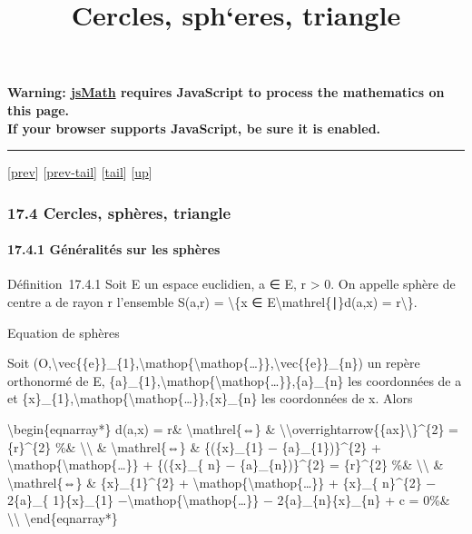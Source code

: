 \documentclass[]{article}
\title{Cercles, sph`eres, triangle}
\author{}
\date{}
\begin{document}
\maketitle

\textbf{Warning: \href{http://www.math.union.edu/locate/jsMath}{jsMath}
requires JavaScript to process the mathematics on this page.\\ If your
browser supports JavaScript, be sure it is enabled.}

\begin{center}\rule{3in}{0.4pt}\end{center}

{[}\href{coursse94.html}{prev}{]}
{[}\href{coursse94.html\#tailcoursse94.html}{prev-tail}{]}
{[}\hyperref[tailcoursse95.html]{tail}{]}
{[}\href{coursch18.html\#coursse95.html}{up}{]}

\subsubsection{17.4 Cercles, sphères, triangle}

\paragraph{17.4.1 Généralités sur les sphères}

Définition~17.4.1 Soit E un espace euclidien, a ∈ E, r \textgreater{} 0.
On appelle sphère de centre a de rayon r l'ensemble S(a,r) =
\textbackslash{}\{x ∈ E\textbackslash{}mathrel\{∣\}d(a,x) =
r\textbackslash{}\}.

Equation de sphères

Soit
(O,\textbackslash{}vec\{\{e\}\}\_\{1\},\textbackslash{}mathop\{\textbackslash{}mathop\{\ldots{}\}\},\textbackslash{}vec\{\{e\}\}\_\{n\})
un repère orthonormé de E,
\{a\}\_\{1\},\textbackslash{}mathop\{\textbackslash{}mathop\{\ldots{}\}\},\{a\}\_\{n\}
les coordonnées de a et
\{x\}\_\{1\},\textbackslash{}mathop\{\textbackslash{}mathop\{\ldots{}\}\},\{x\}\_\{n\}
les coordonnées de x. Alors

\textbackslash{}begin\{eqnarray*\} d(a,x) = r\&
\textbackslash{}mathrel\{⇔\} \&
\textbackslash{}\textbar{}\textbackslash{}overrightarrow\{\{ax\}\textbackslash{}\textbar{}\}\^{}\{2\}
= \{r\}\^{}\{2\} \%\& \textbackslash{}\textbackslash{} \&
\textbackslash{}mathrel\{⇔\} \& \{(\{x\}\_\{1\} −
\{a\}\_\{1\})\}\^{}\{2\} +
\textbackslash{}mathop\{\textbackslash{}mathop\{\ldots{}\}\} +
\{(\{x\}\_\{ n\} − \{a\}\_\{n\})\}\^{}\{2\} = \{r\}\^{}\{2\} \%\&
\textbackslash{}\textbackslash{} \& \textbackslash{}mathrel\{⇔\} \&
\{x\}\_\{1\}\^{}\{2\} +
\textbackslash{}mathop\{\textbackslash{}mathop\{\ldots{}\}\} + \{x\}\_\{
n\}\^{}\{2\} − 2\{a\}\_\{ 1\}\{x\}\_\{1\}
−\textbackslash{}mathop\{\textbackslash{}mathop\{\ldots{}\}\} −
2\{a\}\_\{n\}\{x\}\_\{n\} + c = 0\%\& \textbackslash{}\textbackslash{}
\textbackslash{}end\{eqnarray*\}
\end{document}
